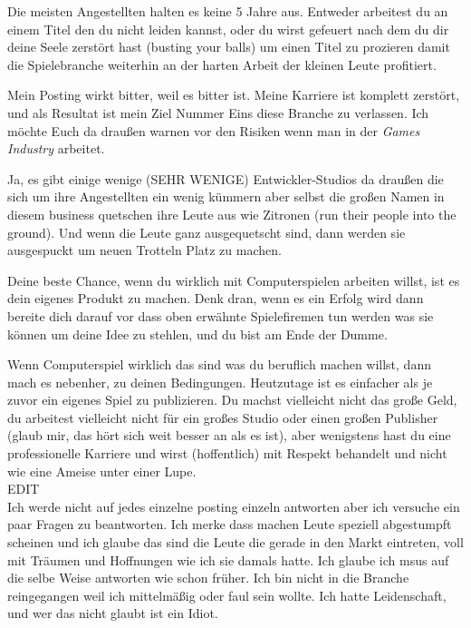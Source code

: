 \documentclass[10pt,a4paper,ngerman,twoside]{article} %
\begin{document}
\begin{multicols}{3}
Die meisten Angestellten halten es keine 5 Jahre aus. Entweder arbeitest du an einem Titel den du nicht leiden kannst, oder du wirst gefeuert nach dem du dir deine Seele zerstört hast (busting your balls) um einen Titel zu prozieren damit die Spielebranche weiterhin an der harten Arbeit der kleinen Leute profitiert.

Mein Posting wirkt bitter, weil es bitter ist. Meine Karriere ist komplett zerstört, und als Resultat ist mein Ziel Nummer Eins diese Branche zu verlassen. Ich möchte Euch da draußen warnen vor den Risiken wenn man in der \textit{Games Industry} arbeitet.

Ja, es gibt einige wenige (SEHR WENIGE) Entwickler-Studios da draußen die sich um ihre Angestellten ein wenig kümmern aber selbst die großen Namen in diesem business quetschen ihre Leute aus wie Zitronen (run their people into the ground). Und wenn die Leute ganz ausgequetscht sind, dann werden sie ausgespuckt um neuen Trotteln Platz zu machen.

Deine beste Chance, wenn du wirklich mit Computerspielen arbeiten willst, ist es dein eigenes Produkt zu machen. Denk dran, wenn es ein Erfolg wird dann bereite dich darauf vor dass oben erwähnte Spielefiremen tun werden was sie können um deine Idee zu stehlen, und du bist am Ende der Dumme. 

Wenn Computerspiel wirklich das sind was du beruflich machen willst, dann mach es nebenher, zu deinen Bedingungen. Heutzutage ist es einfacher als je zuvor ein eigenes Spiel zu publizieren. Du machst vielleicht nicht das große Geld, du arbeitest vielleicht nicht für ein großes Studio oder einen großen Publisher (glaub mir, das hört sich weit besser an als es ist), aber wenigstens hast du eine professionelle Karriere und wirst (hoffentlich) mit Respekt behandelt und nicht wie eine Ameise unter einer Lupe.\\

EDIT\\

Ich werde nicht auf jedes einzelne posting einzeln antworten aber ich versuche ein paar Fragen zu beantworten. Ich merke dass machen Leute speziell abgestumpft scheinen und ich glaube das sind die Leute die gerade in den Markt eintreten, voll mit Träumen und Hoffnungen wie ich sie damals hatte. Ich glaube ich msus auf die selbe Weise antworten wie schon früher. Ich bin nicht in die Branche reingegangen weil ich mittelmäßig oder faul sein wollte. Ich hatte Leidenschaft, und wer das nicht glaubt ist ein Idiot.


\end{multicols}
\end{document}
